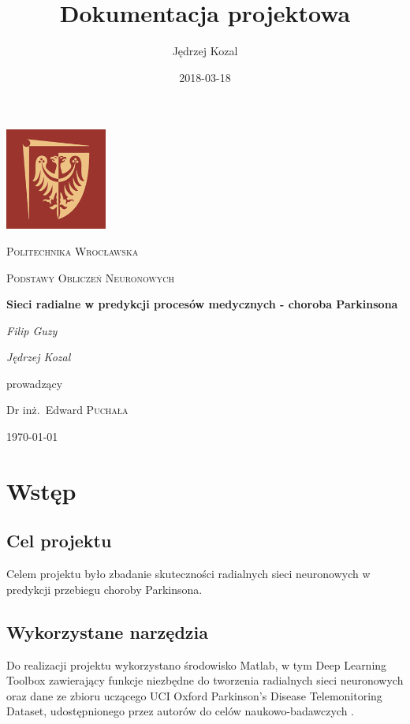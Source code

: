 \documentclass[12pt]{article}
\title{Dokumentacja projektowa}
\date{2018-03-18}
\author{Jędrzej Kozal}
\begin{document}
\begin{titlepage}
	\centering
	\includegraphics[width=0.25\textwidth]{logo_pol_wroclaw.png}\par\vspace{1cm}
	{\scshape\LARGE Politechnika Wrocławska \par}
	\vspace{1cm}
	{\scshape\Large Podstawy Obliczeń Neuronowych\par}
	\vspace{1.5cm}
	{\huge\bfseries Sieci radialne w predykcji procesów medycznych - choroba Parkinsona \par}
	\vspace{2cm}
	{\Large\itshape Filip Guzy\par}
	{\Large\itshape Jędrzej Kozal\par}

	\vfill
	prowadzący\par
	Dr inż.~Edward \textsc{Puchała}

	\vfill

	{\large \today\par}
\end{titlepage}

\tableofcontents
\newpage


\section{Wstęp}

\subsection{Cel projektu}

Celem projektu było zbadanie skuteczności radialnych sieci neuronowych w predykcji przebiegu choroby Parkinsona.

\subsection{Wykorzystane narzędzia}

Do realizacji projektu wykorzystano środowisko Matlab, w tym Deep Learning Toolbox zawierający funkcje niezbędne do tworzenia radialnych sieci neuronowych oraz dane ze zbioru uczącego UCI Oxford Parkinson's Disease Telemonitoring Dataset, udostępnionego przez autorów do celów naukowo-badawczych \cite{zbioruczacy}. 
\end{document}

